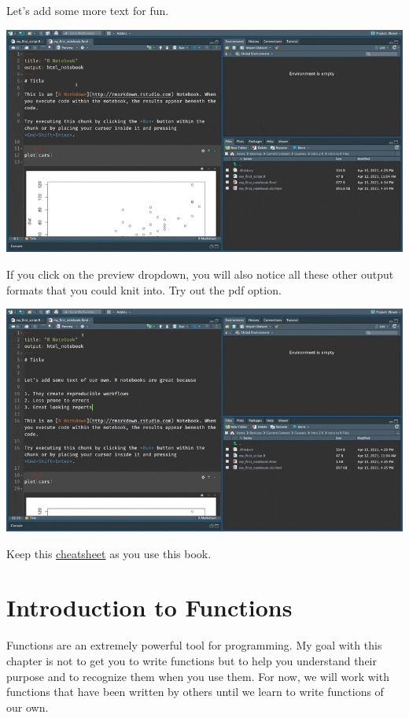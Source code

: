 \documentclass[
]{book}
\begin{document}
Let's add some more text for fun.

\includegraphics{assets/ch_2-notebooks/gifs/text_fun.gif}

If you click on the preview dropdown, you will also notice all these other output formats that you could knit into. Try out the pdf option.

\includegraphics{assets/ch_2-notebooks/gifs/pdf_doc.gif}

Keep this \href{https://www.rstudio.com/wp-content/uploads/2015/03/rmarkdown-reference.pdf}{cheatsheet} as you use this book.

\hypertarget{introduction-to-functions}{%
\chapter{Introduction to Functions}\label{introduction-to-functions}}

Functions are an extremely powerful tool for programming. My goal with this chapter is not to get you to write functions but to help you understand their purpose and to recognize them when you use them. For now, we will work with functions that have been written by others until we learn to write functions of our own.
\end{document}

